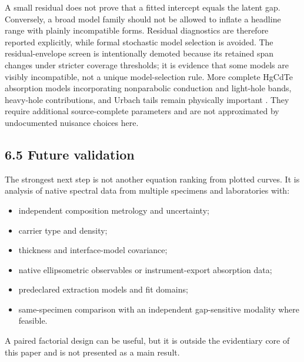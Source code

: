 A small residual does not prove that a fitted intercept equals the
latent gap. Conversely, a broad model family should not be allowed to
inflate a headline range with plainly incompatible forms. Residual
diagnostics are therefore reported explicitly, while formal stochastic
model selection is avoided. The residual-envelope screen is
intentionally demoted because its retained span changes under stricter
coverage thresholds; it is evidence that some models are visibly
incompatible, not a unique model-selection rule. More complete HgCdTe
absorption models incorporating nonparabolic conduction and light-hole
bands, heavy-hole contributions, and Urbach tails remain physically
important \citep{Finkman1984, Chang2006, Chang2007}. They require
additional source-complete parameters and are not approximated by
undocumented nuisance choices here.

\subsection{6.5 Future validation}\label{future-validation}

The strongest next step is not another equation ranking from plotted
curves. It is analysis of native spectral data from multiple specimens
and laboratories with:

\begin{itemize}
\tightlist
\item
  independent composition metrology and uncertainty;
\item
  carrier type and density;
\item
  thickness and interface-model covariance;
\item
  native ellipsometric observables or instrument-export absorption data;
\item
  predeclared extraction models and fit domains;
\item
  same-specimen comparison with an independent gap-sensitive modality
  where feasible.
\end{itemize}

A paired factorial design can be useful, but it is outside the
evidentiary core of this paper and is not presented as a main result.
